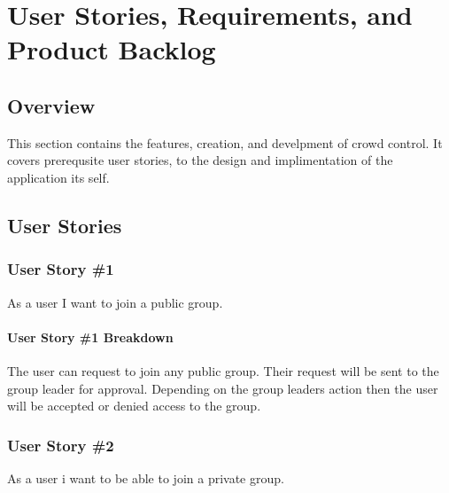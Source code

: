 
\chapter{User Stories,  Requirements, and Product Backlog}
\section{Overview}

This section contains the features, creation, and develpment of crowd control. It covers prerequsite user stories, to the design and implimentation of the application its self.







\section{User Stories}

\subsection{User Story \#1 }
As a user I want to join a public group.

\subsubsection{User Story \#1 Breakdown}
The user can request to join any public group.  Their request will be sent to the group leader for approval.  Depending on the group leaders action then the user will be accepted or denied access to the group. 

\subsection{User Story \#2 }
As a user i want to be able to join a private group.

